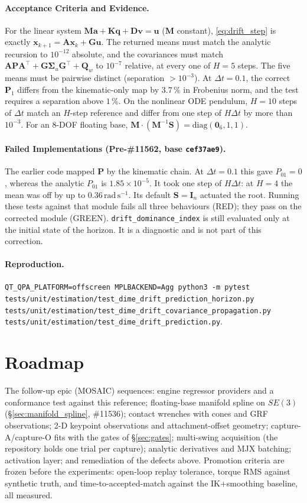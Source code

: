 \documentclass[11pt,a4paper]{article}
\newcommand{\bq}{\mathbf{q}}
\newcommand{\bv}{\mathbf{v}}
\newcommand{\ba}{\mathbf{a}}
\newcommand{\bu}{\mathbf{u}}
\newcommand{\bx}{\mathbf{x}}
\newcommand{\bM}{\mathbf{M}}
\newcommand{\bA}{\mathbf{A}}
\newcommand{\bK}{\mathbf{K}}
\newcommand{\bP}{\mathbf{P}}
\newcommand{\bS}{\mathbf{S}}
\begin{document}
\paragraph{Acceptance Criteria and Evidence.}  For the linear system
$\bM\ba+\bK\bq+\mathbf D\bv=\bu$ ($\bM$ constant), \eqref{eq:drift_step} is exactly
$\bx_{k+1}=\bA\bx_k+\mathbf G\bu$.  The returned means must match the analytic
recursion to $10^{-12}$ absolute, and the covariances must match
$\bA\bP\bA^{\!\top}+\mathbf G\boldsymbol\Sigma_u\mathbf G^{\!\top}+\mathbf Q_w$ to
$10^{-7}$ relative, at every one of $H=5$ steps.  The five means must be
pairwise distinct (separation $>10^{-3}$).  At $\Delta t=0.1$, the correct
$\bP_1$ differs from the kinematic-only map by $3.7\,\%$ in Frobenius norm, and
the test requires a separation above $1\,\%$.  On the nonlinear ODE pendulum,
$H=10$ steps of $\Delta t$ match an $H$-step reference and differ from one step
of $H\Delta t$ by more than $10^{-3}$.  For an 8-DOF floating base,
$\bM\cdot(\bM^{-1}\bS)=\mathrm{diag}(\mathbf 0_6,1,1)$.

\paragraph{Failed Implementations (Pre-\#11562, base \texttt{cef37ae9}).}
The earlier code mapped $\bP$ by the kinematic chain.  At $\Delta t=0.1$ this
gave $P_{01}=0$, whereas the analytic $P_{01}$ is $1.85\times10^{-5}$.  It took
one step of $H\Delta t$: at $H=4$ the mean was off by up to
$0.36\,\mathrm{rad\,s^{-1}}$.  Its default $\bS=\mathbf I_n$ actuated the root.
Running these tests against that module fails all three behaviours (RED); they
pass on the corrected module (GREEN).  \texttt{drift\_dominance\_index} is still
evaluated only at the initial state of the horizon.  It is a diagnostic and is
not part of this correction.

\paragraph{Reproduction.}
\texttt{QT\_QPA\_PLATFORM=offscreen MPLBACKEND=Agg python3 -m pytest
tests/unit/estimation/test\_dime\_drift\_prediction\_horizon.py
tests/unit/estimation/test\_dime\_drift\_covariance\_propagation.py
tests/unit/estimation/test\_dime\_drift\_prediction.py}.

\section{Roadmap}
\label{sec:roadmap}
The follow-up epic (MOSAIC) sequences: engine regressor providers and a
conformance test against this reference; floating-base manifold spline on $SE(3)$
(\S\ref{sec:manifold_spline}, \#11536);
contact wrenches with cones and GRF observations; 2-D keypoint observations and
attachment-offset geometry; capture-A/capture-O fits with the gates of
\S\ref{sec:gates}; multi-swing acquisition (the repository holds one trial per
capture); analytic derivatives and MJX batching; activation layer; and
remediation of the defects above.  Promotion criteria are frozen before the
experiments: open-loop replay tolerance, torque RMS against synthetic truth,
and time-to-accepted-match against the IK+smoothing baseline, all measured.
\end{document}
